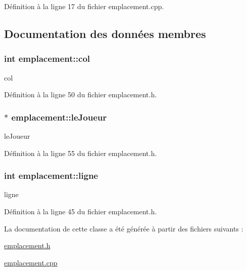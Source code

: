 Définition à la ligne 17 du fichier emplacement.\-cpp.



\subsection{Documentation des données membres}
\hypertarget{classemplacement_ac0af10e9e8d40e815a8b9633019406b1}{
\subsubsection[{col}]{\setlength{\rightskip}{0pt plus 5cm}int emplacement\-::col}}\label{classemplacement_ac0af10e9e8d40e815a8b9633019406b1}


col 



Définition à la ligne 50 du fichier emplacement.\-h.

\hypertarget{classemplacement_a8d9cb5aac12931bb041590456f3b4544}{
\subsubsection[{le\-Joueur}]{ $\ast$ emplacement\-::le\-Joueur}}\label{classemplacement_a8d9cb5aac12931bb041590456f3b4544}


le\-Joueur 



Définition à la ligne 55 du fichier emplacement.\-h.

\hypertarget{classemplacement_aa0e8e131a1d8325f2245c56f8d2e6e8c}{
\subsubsection[{ligne}]{\setlength{\rightskip}{0pt plus 5cm}int emplacement\-::ligne}}\label{classemplacement_aa0e8e131a1d8325f2245c56f8d2e6e8c}


ligne 



Définition à la ligne 45 du fichier emplacement.\-h.



La documentation de cette classe a été générée à partir des fichiers suivants \-:\begin{DoxyCompactItemize}
\item 
\hyperlink{emplacement_8h}{emplacement.\-h}\item 
\hyperlink{emplacement_8cpp}{emplacement.\-cpp}\end{DoxyCompactItemize}
